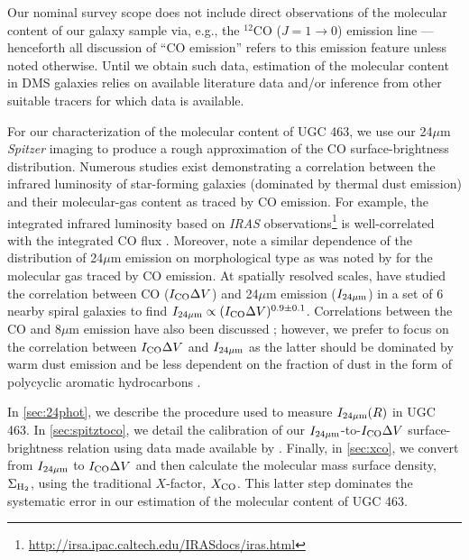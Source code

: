 \documentclass[apj,iop,numberedappendix]{emulateapj}
\begin{document}
Our nominal survey scope does not include direct observations of the molecular
content of our galaxy sample via, e.g., the $^{12}$CO ($J=1\rightarrow0$)
emission line --- henceforth all discussion of ``CO emission'' refers to this
emission feature unless noted otherwise.  Until we obtain such data, estimation
of the molecular content in DMS galaxies relies on available literature data
and/or inference from other suitable tracers for which data is available.

For our characterization of the molecular content of UGC 463, we use our
24$\mu$m {\it Spitzer} imaging to produce a rough approximation of the CO
surface-brightness distribution.  Numerous studies exist demonstrating a
correlation between the infrared luminosity of star-forming galaxies (dominated by
thermal dust emission) and their molecular-gas content as traced by CO emission.
For example, the integrated infrared luminosity based on {\it IRAS}
observations\footnote{
%
\url{http://irsa.ipac.caltech.edu/IRASdocs/iras.html}
%
} is well-correlated with the integrated CO flux \citep{1991ARA&A..29..581Y}.
Moreover, \citet{2007MNRAS.380.1313B} note a similar dependence of the
distribution of 24$\mu$m emission on morphological type as was noted by
\citet{1995ApJS...98..219Y} for the molecular gas traced by CO emission.  At
spatially resolved scales, \citet{2006A&A...456..847P} have studied the
correlation between CO ($I_{\rm CO}\Delta V$) and 24$\mu$m emission ($I_{24\mu{\rm m}}$) in a set of 6
nearby spiral galaxies to find $I_{24\mu{\rm m}} \propto (I_{\rm CO}\Delta V)^{0.9\pm0.1}$.  Correlations
between the CO and 8$\mu$m emission have also been discussed
\citep{2006ApJ...652.1112R, 2010MNRAS.402.1409B}; however, we prefer to focus on
the correlation between $I_{\rm CO}\Delta V$ and $I_{24\mu{\rm m}}$ as the latter should be dominated by
warm dust emission and be less dependent on the fraction of dust in the form of
polycyclic aromatic hydrocarbons \citep[see, e.g.,][]{2007ApJ...657..810D}.

In \sect \ref{sec:24phot}, we describe the procedure used to measure $I_{24\mu{\rm m}}(R)$
in UGC 463.  In \sect \ref{sec:spitztoco}, we detail the calibration of our
$I_{24\mu{\rm m}}$-to-$I_{\rm CO}\Delta V$ surface-brightness relation using data made available by
\citet[][hereafter ]{2008AJ....136.2782L}.
Finally, in \sect \ref{sec:xco}, we convert from $I_{24\mu{\rm m}}$ to $I_{\rm CO}\Delta V$ and then
calculate the molecular mass surface density, $\Sigma_{\rm H_2}$, using the traditional
$X$-factor, $X_{\rm CO}$.  This latter step dominates the systematic error in our
estimation of the molecular content of UGC 463.
\end{document}
